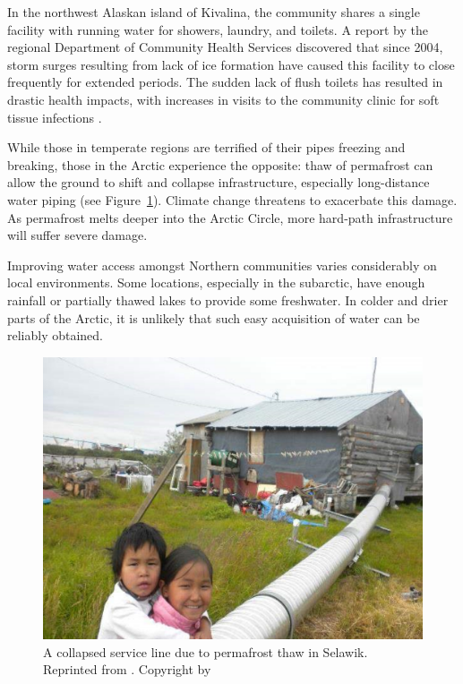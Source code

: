 \documentclass[american]{../../../coursework}
\begin{document}
In the northwest Alaskan island of Kivalina, the community shares a single
facility with running water for showers, laundry, and toilets. A report by the
regional Department of Community Health Services discovered that since 2004,
storm surges resulting from lack of ice formation have caused this facility to
close frequently for extended periods. The sudden lack of flush toilets has
resulted in drastic health impacts, with increases in visits to the community
clinic for soft tissue infections \parencite{Thomas2013}.

While those in temperate regions are terrified of their pipes freezing and
breaking, those in the Arctic experience the opposite: thaw of permafrost can
allow the ground to shift and collapse infrastructure, especially
long-distance water piping (see Figure~\ref{fig:photo}). Climate change
threatens to exacerbate this damage. As permafrost melts deeper into the
Arctic Circle, more hard-path infrastructure will suffer severe damage.

Improving water access amongst Northern communities varies considerably on
local environments. Some locations, especially in the subarctic, have enough
rainfall or partially thawed lakes to provide some freshwater. In colder and
drier parts of the Arctic, it is unlikely that such easy acquisition of water
can be reliably obtained.

\begin{figure}
    \begin{center}
        \includegraphics[width=\textwidth]{arctic_photo.png}
    \end{center}
    \caption{A collapsed service line due to permafrost thaw in Selawik. Reprinted from . Copyright
    \citeyear{Brubaker2016} by \citeauthor{Brubaker2016}}%
    \label{fig:photo}
\end{figure}
\end{document}
